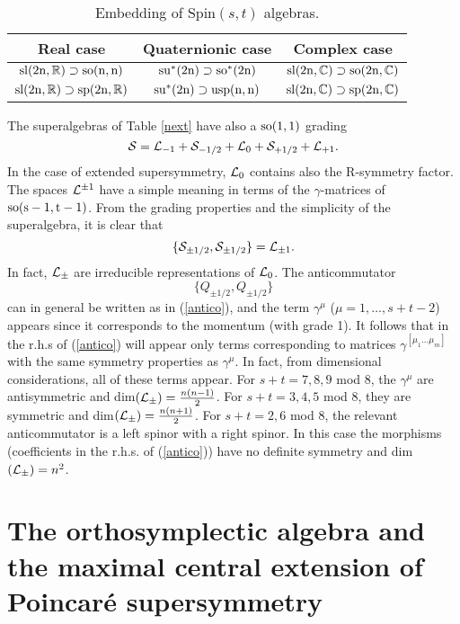 \documentclass[a4paper,12pt]{article}
\begin{document}
\begin{table}[ht]
\begin{center}
\begin{tabular} {|c||c||c|}

\hline Real case& Quaternionic case&Complex case\\\hline\hline


 $\rm{sl}(2n,\mathbb{R})\supset\rm{so}(n,n)$
 &$\rm{su}^*(2n)\supset\rm{so}^*(2n)$&$\rm{sl}(2n,\mathbb{C})\supset\rm{so}(2n,\mathbb{C})$

\\\hline

$\rm{sl}(2n,\mathbb{R})\supset\rm{sp}(2n,\mathbb{R})$&$\rm{su}^*(2n)\supset\rm{usp}
(n,n)$&$\rm{sl}(2n,\mathbb{C})\supset\rm{sp}(2n,\mathbb{C})$



\\\hline



\end{tabular}
\caption{Embedding of Spin$(s,t)$ algebras.}\label{emb}
\end{center}
\end{table}
The superalgebras of Table \ref{next} have also a $\rm{so}(1,1)$
grading $$\mathcal{S}=\mathcal{L}_{-1}+\mathcal{S}_{-1/2}+\mathcal{L}_{0}+\mathcal{S}_{+1/2}+\mathcal{L}_{+1}.$$ In
the case of extended supersymmetry, $\mathcal{L}_0$ contains also the
R-symmetry factor. The spaces $\mathcal{L}^{\pm1}$ have a simple meaning
in terms of the $\gamma$-matrices of $\rm{so}(s-1,t-1)$. From the
grading properties and the simplicity of the superalgebra,  it is
clear that $$\{\mathcal{S}_{\pm1/2},\mathcal{S}_{\pm1/2}\}=\mathcal{L}_{\pm1}.$$ In fact,
$\mathcal{L}_\pm$ are irreducible representations of $\mathcal{L}_0$. The
anticommutator $$\{Q_{\pm1/2},Q_{\pm1/2}\}$$ can in general be
written as in (\ref{antico}), and the term $\gamma^\mu$
($\mu=1,\dots, s+t-2$) appears since it corresponds to the
momentum (with grade 1). It follows that in the r.h.s of
(\ref{antico}) will appear only terms corresponding to
 matrices $\gamma^{[\mu_1\dots \mu_m]}$ with the same symmetry properties as
$\gamma^\mu$. In fact, from dimensional considerations, all of
these terms appear. For $s+t=7,8,9$ mod 8, the  $\gamma^\mu$ are
antisymmetric and  dim$(\mathcal{L}_\pm)=\frac{n(n-1)}{2}$. For
$s+t=3,4,5$ mod 8, they are symmetric and
dim$(\mathcal{L}_\pm)=\frac{n(n+1)}{2}$. For $s+t=2,6$ mod 8, the relevant
anticommutator is  a left spinor with a right spinor. In this case
the morphisms (coefficients in the r.h.s. of (\ref{antico})) have
no definite symmetry  and dim$(\mathcal{L}_\pm)=n^2$.

\section{The orthosymplectic algebra and the  maximal central extension
of  Poincar\'e supersymmetry }
\end{document}
